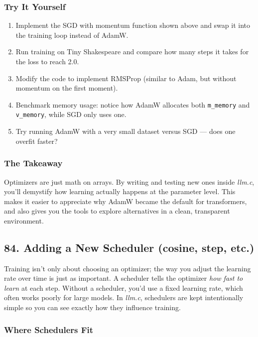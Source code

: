 \documentclass[
  letterpaper,
  DIV=11,
  numbers=noendperiod]{scrreprt}
\providecommand{\tightlist}{%
  \setlength{\itemsep}{0pt}\setlength{\parskip}{0pt}}
\begin{document}
\subsubsection{Try It Yourself}\label{try-it-yourself-71}

\begin{enumerate}
\def\labelenumi{\arabic{enumi}.}
\tightlist
\item
  Implement the SGD with momentum function shown above and swap it into
  the training loop instead of AdamW.
\item
  Run training on Tiny Shakespeare and compare how many steps it takes
  for the loss to reach 2.0.
\item
  Modify the code to implement RMSProp (similar to Adam, but without
  momentum on the first moment).
\item
  Benchmark memory usage: notice how AdamW allocates both
  \texttt{m\_memory} and \texttt{v\_memory}, while SGD only uses one.
\item
  Try running AdamW with a very small dataset versus SGD --- does one
  overfit faster?
\end{enumerate}

\subsubsection{The Takeaway}\label{the-takeaway-72}

Optimizers are just math on arrays. By writing and testing new ones
inside \emph{llm.c}, you'll demystify how learning actually happens at
the parameter level. This makes it easier to appreciate why AdamW became
the default for transformers, and also gives you the tools to explore
alternatives in a clean, transparent environment.

\subsection{84. Adding a New Scheduler (cosine, step,
etc.)}\label{adding-a-new-scheduler-cosine-step-etc.}

Training isn't only about choosing an optimizer; the way you adjust the
learning rate over time is just as important. A scheduler tells the
optimizer \emph{how fast to learn} at each step. Without a scheduler,
you'd use a fixed learning rate, which often works poorly for large
models. In \emph{llm.c}, schedulers are kept intentionally simple so you
can see exactly how they influence training.

\subsubsection{Where Schedulers Fit}\label{where-schedulers-fit}
\end{document}
